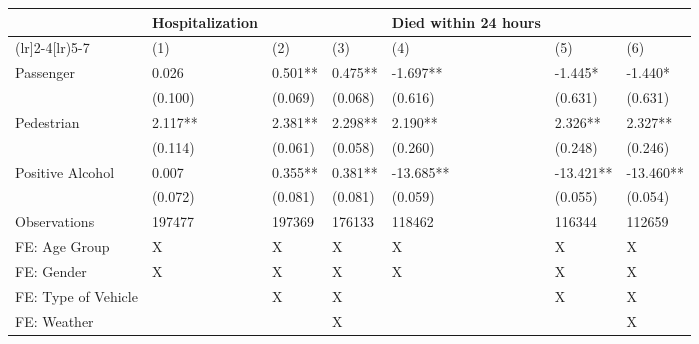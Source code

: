 \begin{tabular}{lllllll}
\hline
& Hospitalization &  &  & Died within 24 hours &  &  \\ \cmidrule(lr]{2-4}\cmidrule[lr){5-7}
& (1) & (2) & (3) & (4) & (5) & (6) \\ \hline
Passenger           & 0.026   & 0.501** & 0.475** & -1.697**  & -1.445*   & -1.440*   \\
& (0.100) & (0.069) & (0.068) & (0.616)   & (0.631)   & (0.631)   \\
Pedestrian          & 2.117** & 2.381** & 2.298** & 2.190**   & 2.326**   & 2.327**   \\
& (0.114) & (0.061) & (0.058) & (0.260)   & (0.248)   & (0.246)   \\
Positive Alcohol    & 0.007   & 0.355** & 0.381** & -13.685** & -13.421** & -13.460** \\
& (0.072) & (0.081) & (0.081) & (0.059)   & (0.055)   & (0.054)   \\
Observations        & 197477  & 197369  & 176133  & 118462    & 116344    & 112659    \\
FE: Age Group       & X       & X       & X       & X         & X         & X         \\
FE: Gender          & X       & X       & X       & X         & X         & X         \\
FE: Type of Vehicle &         & X       & X       &           & X         & X         \\
FE: Weather         &         &         & X       &           &           & X         \\
\hline
\end{tabular}
